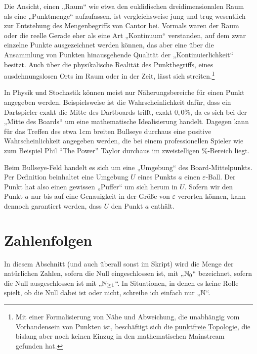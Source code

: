 \begin{bem}[Intuition]
    Die Ansicht, einen „Raum“ wie etwa den euklidischen dreidimensionalen Raum als eine „Punktmenge“ aufzufassen, ist vergleichsweise jung und trug wesentlich zur Entstehung des Mengenbegriffs von Cantor bei. Vormals waren der Raum oder die reelle Gerade eher als eine Art „Kontinuum“ verstanden, auf dem zwar einzelne Punkte ausgezeichnet werden können, das aber eine über die Ansammlung von Punkten hinausgehende Qualität der „Kontinuierlichkeit“ besitzt. Auch über die physikalische Realität des Punktbegriffs, eines ausdehnungslosen Orts im Raum oder in der Zeit, lässt sich streiten.\footnote{Mit einer Formalisierung von Nähe und Abweichung, die unabhängig vom Vorhandensein von Punkten ist, beschäftigt sich die \href{https://en.wikipedia.org/wiki/Pointless_topology}{punktfreie Topologie}, die bislang aber noch keinen Einzug in den mathematischen Mainstream gefunden hat.}
    
    In Physik und Stochastik können meist nur Näherungsbereiche für einen Punkt angegeben werden. Beispielsweise ist die Wahrscheinlichkeit dafür, dass ein Dartspieler exakt die Mitte des Dartboards trifft, exakt $0{,}0\%$, da es sich bei der „Mitte des Boards“ um eine mathematische Idealisierung handelt. Dagegen kann für das Treffen des etwa 1cm breiten Bullseye durchaus eine positive Wahrscheinlichkeit angegeben werden, die bei einem professionellen Spieler wie zum Beispiel Phil ``The Power'' Taylor durchaus im zweistelligen \%-Bereich liegt.
    
    Beim Bullseye-Feld handelt es sich um eine „Umgebung“ des Board-Mittelpunkts. Per Definition beinhaltet eine Umgebung $U$ eines Punkts $a$ einen $\varepsilon$-Ball. Der Punkt hat also einen gewissen „Puffer“ um sich herum in $U$. Sofern wir den Punkt $a$ nur bis auf eine Genauigkeit in der Größe von $\varepsilon$ verorten können, kann dennoch garantiert werden, dass $U$ den Punkt $a$ enthält.
\end{bem}





\section{Zahlenfolgen}


\begin{bem}
    In diesem Abschnitt (und auch überall sonst im Skript) wird die Menge der natürlichen Zahlen, sofern die Null eingeschlossen ist, mit „$\mathbb N_0$“ bezeichnet, sofern die Null ausgeschlossen ist mit „$\mathbb N_{\ge 1}$“. In Situationen, in denen es keine Rolle spielt, ob die Null dabei ist oder nicht, schreibe ich einfach nur „$\mathbb N$“.
\end{bem}


